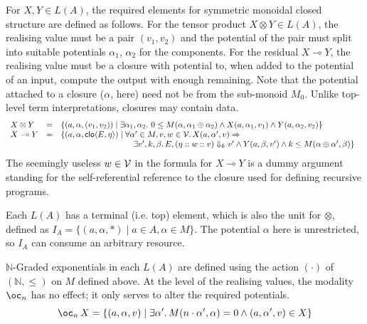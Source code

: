 \documentclass[acmsmall,review,screen,anonymous]{acmart}
\begin{document}
For $X, Y \in L(A)$, the required elements for symmetric monoidal
closed structure are defined as follows. For the tensor product
$X \otimes Y \in L(A)$, the realising value must be a pair $(v_1,v_2)$
and the potential of the pair must split into suitable potentials
$\alpha_1$, $\alpha_2$ for the components. For the residual
$X \multimap Y$, the realising value must be a closure with potential
to, when added to the potential of an input, compute the output with
enough remaining. Note that the potential attached to a closure
($\alpha$, here) need not be from the sub-monoid $M_0$. Unlike
top-level term interpretations, closures may contain data.
\begin{displaymath}
  \begin{array}{lcl}
    X \otimes Y &=& \{ (a, \alpha, (v_1, v_2)) \mid \exists \alpha_1, \alpha_2.~0 \leq M(\alpha, \alpha_1 \rplus \alpha_2) \land X(a,\alpha_1,v_1) \land Y(a,\alpha_2,v_2) \}\\
    X \multimap Y &=& \{ (a, \alpha, \clo{E}{\eta}) \mid
                      \begin{array}[t]{@{}l}
                        \forall \alpha' \in M, v,w \in \ValSet.\,X(a,\alpha',v) \Rightarrow\\
                        \quad \exists v', k, \beta.\,
                        E, (\eta :: w :: v) \Downarrow_k v' \land Y(a,\beta,v') \land k \leq M(\alpha \rplus \alpha', \beta) \} \end{array}
  \end{array}
\end{displaymath}
The seemingly useless $w \in \mathcal{V}$ in the formula for
$X \multimap Y$ is a dummy argument standing for the self-referential
reference to the closure used for defining recursive programs.

Each $L(A)$ has a terminal (i.e. top) element, which is also the unit
for $\otimes$, defined as
$I_A = \{(a, \alpha, *) \mid a \in A, \alpha \in M\}$. The potential
$\alpha$ here is unrestricted, so $I_A$ can consume an arbitrary
resource.

$\mathbb{N}$-Graded exponentials in each $L(A)$ are defined using the
action $(\cdot)$ of $(\mathbb{N}, \leq)$ on $M$ defined above. At the
level of the realising values, the modality $\oc_n$ has no effect; it
only serves to alter the required potentials.
\begin{displaymath}
  \oc_n\,X = \{(a,\alpha,v) \mid \exists \alpha'.\,M(n \cdot \alpha', \alpha) = 0 \land (a, \alpha', v) \in X \}
\end{displaymath}
\end{document}
